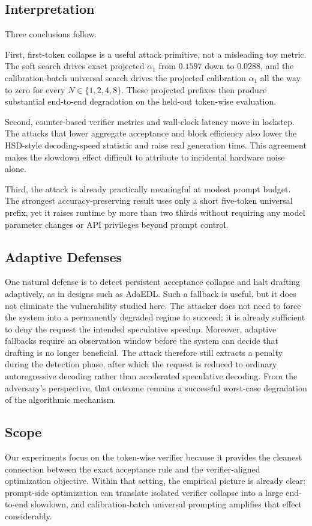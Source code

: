 \subsection{Interpretation}

Three conclusions follow.

First, first-token collapse is a useful attack primitive, not a misleading toy
metric. The soft search drives exact projected $\alpha_1$ from $0.1597$ down to
$0.0288$, and the calibration-batch universal search drives the projected
calibration $\alpha_1$ all the way to zero for every $N \in \{1,2,4,8\}$.
These projected prefixes then produce substantial end-to-end degradation on the
held-out token-wise evaluation.

Second, counter-based verifier metrics and wall-clock latency move in lockstep.
The attacks that lower aggregate acceptance and block efficiency also lower the
HSD-style decoding-speed statistic and raise real generation time. This
agreement makes the slowdown effect difficult to attribute to incidental
hardware noise alone.

Third, the attack is already practically meaningful at modest prompt budget.
The strongest accuracy-preserving result uses only a short five-token universal
prefix, yet it raises runtime by more than two thirds without requiring any
model parameter changes or API privileges beyond prompt control.

\subsection{Adaptive Defenses}

One natural defense is to detect persistent acceptance collapse and halt
drafting adaptively, as in designs such as AdaEDL. Such a fallback is useful,
but it does not eliminate the vulnerability studied here. The attacker does
not need to force the system into a permanently degraded regime to succeed; it
is already sufficient to deny the request the intended speculative speedup.
Moreover, adaptive fallbacks require an observation window before the system
can decide that drafting is no longer beneficial. The attack therefore still
extracts a penalty during the detection phase, after which the request is
reduced to ordinary autoregressive decoding rather than accelerated
speculative decoding. From the adversary's perspective, that outcome remains a
successful worst-case degradation of the algorithmic mechanism.

\subsection{Scope}

Our experiments focus on the token-wise verifier because it provides the
cleanest connection between the exact acceptance rule and the verifier-aligned
optimization objective. Within that setting, the empirical picture is already
clear: prompt-side optimization can translate isolated verifier collapse into a
large end-to-end slowdown, and calibration-batch universal prompting amplifies
that effect considerably.
